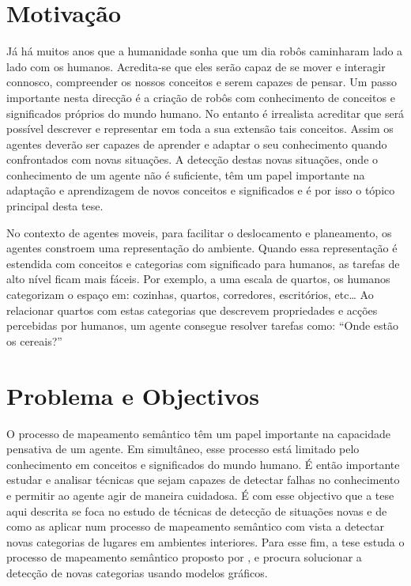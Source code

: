 \documentclass[9pt,a4paper]{extarticle}
\begin{document}
\begin{multicols}{2}

\section{Motivação}
Já há muitos anos que a humanidade sonha que um dia robôs caminharam lado a lado com os humanos.
Acredita-se que eles serão capaz de se mover e interagir connosco, compreender os nossos conceitos
e serem capazes de pensar.
Um passo importante nesta direcção é a criação de robôs com conhecimento de conceitos e significados
próprios do mundo humano.
No entanto é irrealista acreditar que será possível descrever e representar em toda a sua extensão
tais conceitos. Assim os agentes deverão ser capazes de aprender e adaptar o seu conhecimento quando
confrontados com novas situações.
A detecção destas novas situações, onde o conhecimento de um agente não é suficiente, têm um papel importante
na adaptação e aprendizagem de novos conceitos e significados e é por isso o tópico principal desta tese.

No contexto de agentes moveis, para facilitar o deslocamento e planeamento, os
agentes constroem uma representação do ambiente. Quando essa representação é estendida com
conceitos e categorias com significado para humanos, as tarefas de alto nível ficam mais fáceis.
Por exemplo, a uma escala de quartos, os humanos categorizam o espaço em: cozinhas, quartos, corredores,
escritórios, etc\dots
Ao relacionar quartos com estas categorias que descrevem propriedades e acções percebidas por
humanos, um agente consegue resolver tarefas como: ``Onde estão os cereais?''

\section{Problema e Objectivos}
O processo de mapeamento semântico têm um papel importante na capacidade pensativa de um agente.
Em simultâneo, esse processo está limitado pelo conhecimento em conceitos e significados do mundo humano.
É então importante estudar e analisar técnicas que sejam capazes de detectar falhas no conhecimento e permitir ao agente agir de maneira
cuidadosa.
É com esse objectivo que a tese aqui descrita se foca no estudo de técnicas de detecção de situações novas
e de como as aplicar num processo de mapeamento semântico com vista a detectar novas categorias de lugares
em ambientes interiores. Para esse fim, a tese estuda o processo de mapeamento semântico proposto por \cite{pronobis2011phd},
e procura solucionar a detecção de novas categorias usando modelos gráficos.


\end{multicols}
\end{document}
